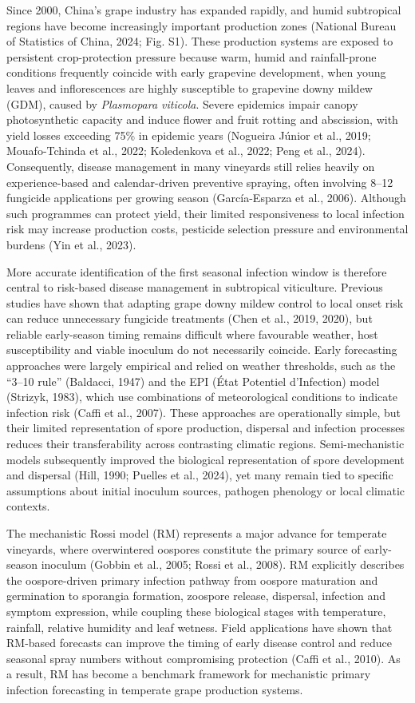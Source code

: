 \documentclass[
]{article}
\begin{document}
Since 2000, China's grape industry has expanded rapidly, and humid
subtropical regions have become increasingly important production zones
(National Bureau of Statistics of China, 2024; Fig. S1). These
production systems are exposed to persistent crop-protection pressure
because warm, humid and rainfall-prone conditions frequently coincide
with early grapevine development, when young leaves and inflorescences
are highly susceptible to grapevine downy mildew (GDM), caused by
\emph{Plasmopara viticola}. Severe epidemics impair canopy
photosynthetic capacity and induce flower and fruit rotting and
abscission, with yield losses exceeding 75\% in epidemic years (Nogueira
Júnior et al., 2019; Mouafo-Tchinda et al., 2022; Koledenkova et al.,
2022; Peng et al., 2024). Consequently, disease management in many
vineyards still relies heavily on experience-based and calendar-driven
preventive spraying, often involving 8--12 fungicide applications per
growing season (García-Esparza et al., 2006). Although such programmes
can protect yield, their limited responsiveness to local infection risk
may increase production costs, pesticide selection pressure and
environmental burdens (Yin et al., 2023).

More accurate identification of the first seasonal infection window is
therefore central to risk-based disease management in subtropical
viticulture. Previous studies have shown that adapting grape downy
mildew control to local onset risk can reduce unnecessary fungicide
treatments (Chen et al., 2019, 2020), but reliable early-season timing
remains difficult where favourable weather, host susceptibility and
viable inoculum do not necessarily coincide. Early forecasting
approaches were largely empirical and relied on weather thresholds, such
as the ``3--10 rule'' (Baldacci, 1947) and the EPI (État Potentiel
d'Infection) model (Strizyk, 1983), which use combinations of
meteorological conditions to indicate infection risk (Caffi et al.,
2007). These approaches are operationally simple,
but their limited representation of spore production, dispersal and
infection processes reduces their transferability across contrasting
climatic regions. Semi-mechanistic models subsequently improved the
biological representation of spore development and dispersal (Hill,
1990; Puelles et al., 2024), yet many remain tied to specific assumptions
about initial inoculum sources, pathogen phenology or local climatic
contexts.

The mechanistic Rossi model (RM) represents a major advance for
temperate vineyards, where overwintered oospores constitute the primary
source of early-season inoculum (Gobbin et al., 2005; Rossi et al.,
2008). RM explicitly describes the oospore-driven primary infection
pathway from oospore maturation and germination to sporangia formation,
zoospore release, dispersal, infection and symptom expression, while
coupling these biological stages with temperature, rainfall, relative
humidity and leaf wetness. Field applications have shown that RM-based
forecasts can improve the timing of early disease control and reduce
seasonal spray numbers without compromising protection (Caffi et al.,
2010). As a result, RM has become a benchmark framework for
mechanistic primary infection forecasting in temperate grape production
systems.
\end{document}
